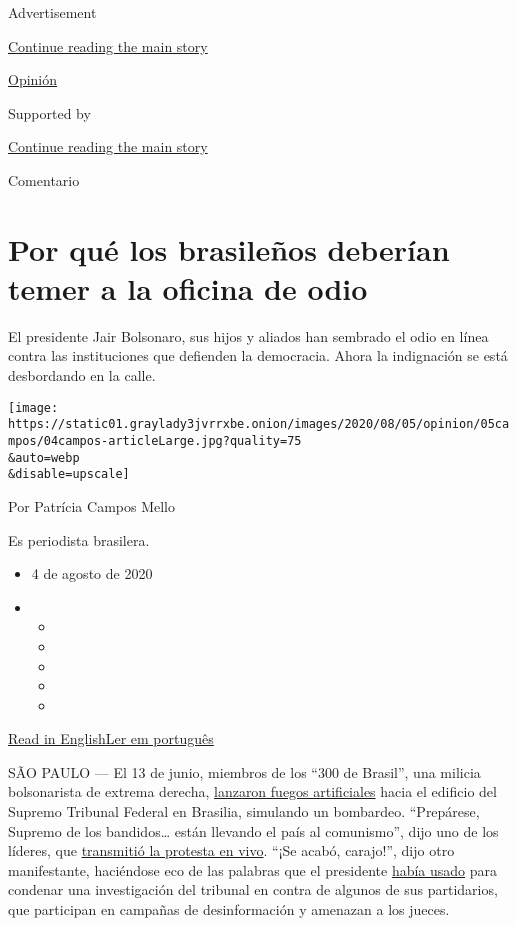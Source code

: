 Advertisement

\protect\hyperlink{after-top}{Continue reading the main story}

\href{/es/section/opinion}{Opinión}

Supported by

\protect\hyperlink{after-sponsor}{Continue reading the main story}

Comentario

\hypertarget{por-quuxe9-los-brasileuxf1os-deberuxedan-temer-a-la-oficina-de-odio}{%
\section{Por qué los brasileños deberían temer a la oficina de
odio}\label{por-quuxe9-los-brasileuxf1os-deberuxedan-temer-a-la-oficina-de-odio}}

El presidente Jair Bolsonaro, sus hijos y aliados han sembrado el odio
en línea contra las instituciones que defienden la democracia. Ahora la
indignación se está desbordando en la calle.

\texttt{[image: https://static01.graylady3jvrrxbe.onion/images/2020/08/05/opinion/05campos/04campos-articleLarge.jpg?quality=75\\\&auto=webp\\\&disable=upscale]}

Por Patrícia Campos Mello

Es periodista brasilera.

\begin{itemize}
\item
  4 de agosto de 2020
\item
  \begin{itemize}
  \item
  \item
  \item
  \item
  \item
  \end{itemize}
\end{itemize}

\href{https://www.nytimes3xbfgragh.onion/2020/08/04/opinion/bolsonaro-office-of-hate-brazil.html}{Read
in
English}\href{https://www.nytimes3xbfgragh.onion/pt/2020/08/04/opinion/international-world/bolsonaro-gabinete-do-odio.html}{Ler
em português}

SÃO PAULO --- El 13 de junio, miembros de los ``300 de Brasil'', una
milicia bolsonarista de extrema derecha,
\href{https://www1.folha.uol.com.br/poder/2020/05/sara-winter-xinga-moraes-diz-querer-trocar-socos-com-ele-e-promete-inferniza-lo.shtml}{lanzaron
fuegos artificiales} hacia el edificio del Supremo Tribunal Federal en
Brasilia, simulando un bombardeo. ``Prepárese, Supremo de los
bandidos\ldots{} están llevando el país al comunismo'', dijo uno de los
líderes, que
\href{https://www.metropoles.com/brasil/video-bolsonaristas-lancam-fogos-de-artificio-em-predio-do-stf}{transmitió
la protesta en vivo}. ``¡Se acabó, carajo!'', dijo otro manifestante,
haciéndose eco de las palabras que el presidente
\href{https://www.youtube.com/watch?v=I2bZoC8FHJI}{había usado} para
condenar una investigación del tribunal en contra de algunos de sus
partidarios, que participan en campañas de desinformación y amenazan a
los jueces.

